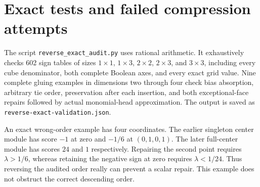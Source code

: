 \documentclass[11pt]{article}
\begin{document}
\section{Exact tests and failed compression attempts}
The script \texttt{reverse\_exact\_audit.py} uses rational arithmetic.
It exhaustively checks 602 sign tables of sizes $1\times1$, $1\times3$,
$2\times2$, $2\times3$, and $3\times3$, including every cube denominator,
both complete Boolean axes, and every exact grid value.
Nine complete gluing examples in dimensions two through four check bias
absorption, arbitrary tie order, preservation after each insertion, and
both exceptional-face repairs followed by actual monomial-head approximation.
The output is saved as \texttt{reverse-exact-validation.json}.

An exact wrong-order example has four coordinates. The earlier singleton
center module has score $-1$ at zero and $-1/6$ at $(0,1,0,1)$.
The later full-center module has scores $24$ and $1$ respectively.
Repairing the second point requires $\lambda>1/6$, whereas retaining the
negative sign at zero requires $\lambda<1/24$. Thus reversing the audited
order really can prevent a scalar repair. This example does not obstruct
the correct descending order.
\end{document}
